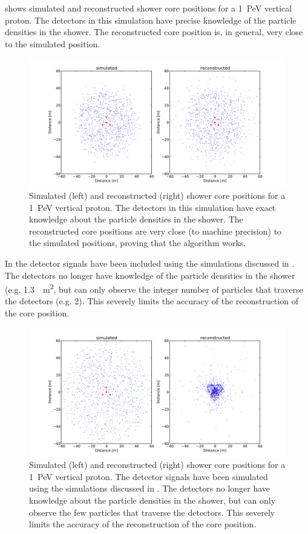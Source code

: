  shows simulated and reconstructed shower core positions
for a \SI{1}{\peta\electronvolt} vertical proton.  The detectors in this
simulation have precise knowledge of the particle densities in the shower.
The reconstructed core position is, in general, very close to the simulated
position.
\begin{figure}
\centering
\includegraphics[width=.8\linewidth]{raw-plots/COR-plot_scatter_reconstructed_core-EXACT.png}
\caption{Simulated (left) and reconstructed (right) shower core positions
for a \SI{1}{\peta\electronvolt} vertical proton.  The detectors in this
simulation have exact knowledge about the particle densities in the
shower.  The reconstructed core positions are very close (to machine
precision) to the simulated positions, proving that the algorithm works.}
\label{fig:core-two}
\end{figure}
In  the detector signals have
been included using the simulations discussed in .
The detectors no longer have knowledge of the particle densities in the shower
(e.g. \SI{1.3}{\per\square\meter}, but can only observe the integer number of
particles that traverse the detectors (e.g. 2).
This severely limits the accuracy of the reconstruction of the core position.
\begin{figure}
\centering
\includegraphics[width=.8\linewidth]{raw-plots/COR-plot_scatter_reconstructed_core-GROUND-GAUSS_20.png}
\caption{Simulated (left) and reconstructed (right) shower core positions for a
\SI{1}{\peta\electronvolt} vertical proton.
The detector signals have been simulated using the simulations
discussed in .  The detectors no longer have
knowledge about the particle densities in the shower, but can only observe the
few particles that traverse the detectors.  This severely limits the
accuracy of the reconstruction of the core position.}
\label{fig:core-twob}
\end{figure}

